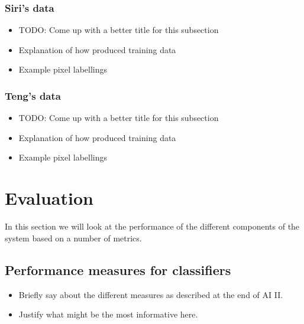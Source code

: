 \documentclass[12pt,twoside,notitlepage]{report}
\begin{document}
        \subsection{Siri's data}
            \begin{itemize}
                \item TODO: Come up with a better title for this subsection
                \item Explanation of how produced training data
                \item Example pixel labellings
            \end{itemize}

        \subsection{Teng's data}
            \begin{itemize}
                \item TODO: Come up with a better title for this subsection
                \item Explanation of how produced training data
                \item Example pixel labellings
            \end{itemize}









\cleardoublepage
\chapter{Evaluation}
    In this section we will look at the performance of the different components of the system based on a number of 
    metrics. 

    \section{Performance measures for classifiers}
        \begin{itemize}
            \item Briefly say about the different measures as described at the end of AI II.
            \item Justify what might be the most informative here.
        \end{itemize}
\end{document}
